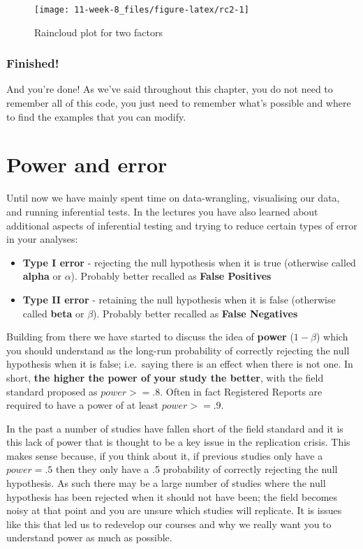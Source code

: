 \documentclass[]{book}
\providecommand{\tightlist}{%
  \setlength{\itemsep}{0pt}\setlength{\parskip}{0pt}}
\begin{document}
\begin{figure}

{\centering \texttt{[image: 11-week-8\_files/figure-latex/rc2-1]} 

}

\caption{Raincloud plot for two factors}\label{fig:rc2}
\end{figure}

\hypertarget{finished-7}{%
\subsection{Finished!}\label{finished-7}}

And you're done! As we've said throughout this chapter, you do not need to remember all of this code, you just need to remember what's possible and where to find the examples that you can modify.

\hypertarget{power-and-error}{%
\chapter{Power and error}\label{power-and-error}}

Until now we have mainly spent time on data-wrangling, visualising our data, and running inferential tests. In the lectures you have also learned about additional aspects of inferential testing and trying to reduce certain types of error in your analyses:

\begin{itemize}
\tightlist
\item
  \textbf{Type I error} - rejecting the null hypothesis when it is true (otherwise called \textbf{alpha} or \(\alpha\)). Probably better recalled as \textbf{False Positives}
\item
  \textbf{Type II error} - retaining the null hypothesis when it is false (otherwise called \textbf{beta} or \(\beta\)). Probably better recalled as \textbf{False Negatives}
\end{itemize}

Building from there we have started to discuss the idea of \textbf{power} (\(1-\beta\)) which you should understand as the long-run probability of correctly rejecting the null hypothesis when it is false; i.e.~saying there is an effect when there is not one. In short, \textbf{the higher the power of your study the better}, with the field standard proposed as \(power >= .8\). Often in fact Registered Reports are required to have a power of at least \(power >= .9\).

In the past a number of studies have fallen short of the field standard and it is this lack of power that is thought to be a key issue in the replication crisis. This makes sense because, if you think about it, if previous studies only have a \(power = .5\) then they only have a .5 probability of correctly rejecting the null hypothesis. As such there may be a large number of studies where the null hypothesis has been rejected when it should not have been; the field becomes noisy at that point and you are unsure which studies will replicate. It is issues like this that led us to redevelop our courses and why we really want you to understand power as much as possible.
\end{document}

